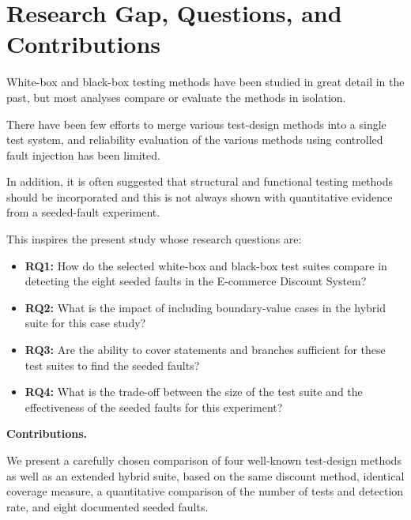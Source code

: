 \documentclass[conference]{IEEEtran}
\begin{document}

\section{Research Gap, Questions, and Contributions}

\label{sec:gap}



White-box and black-box testing methods have been studied in great detail in the past, but most analyses compare or evaluate the methods in isolation.

There have been few efforts to merge various test-design methods into a single test system, and reliability evaluation of the various methods using controlled fault injection has been limited.

In addition, it is often suggested that structural and functional testing methods should be incorporated and this is not always shown with quantitative evidence from a seeded-fault experiment.



This inspires the present study whose research questions are:



\begin{itemize}

    \item \textbf{RQ1:} How do the selected white-box and black-box test suites compare in detecting the eight seeded faults in the E-commerce Discount System?

    \item \textbf{RQ2:} What is the impact of including boundary-value cases in the hybrid suite for this case study?

    \item \textbf{RQ3:} Are the ability to cover statements and branches sufficient for these test suites to find the seeded faults?

    \item \textbf{RQ4:} What is the trade-off between the size of the test suite and the effectiveness of the seeded faults for this experiment?

\end{itemize}



\noindent\textbf{Contributions.}

We present a carefully chosen comparison of four well-known test-design methods as well as an extended hybrid suite, based on the same discount method, identical coverage measure, a quantitative comparison of the number of tests and detection rate, and eight documented seeded faults.
\end{document}
